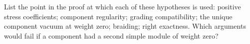 \begin{exercise}\label{ex:c-regular-6}
List the point in the proof at which each of these hypotheses is used:
positive stress coefficients; component regularity; grading
compatibility; the unique component vacuum at weight zero; braiding;
right exactness. Which arguments would fail if a component had a
second simple module of weight zero?

\par\smallskip{}\par
\end{exercise}
